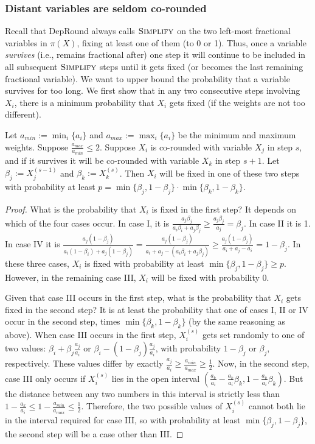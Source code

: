 \subsubsection{Distant variables are seldom co-rounded}
Recall that {\sc DepRound} always calls $\textsc{Simplify}$ on the two left-most fractional variables in $\pi(X)$, fixing at least one of them (to 0 or 1). Thus, once a variable \emph{survives} (i.e., remains fractional after) one step it will continue to be included in all subsequent $\textsc{Simplify}$ steps until it gets fixed (or becomes the last remaining fractional variable). We want to upper bound the probability that a variable survives for too long. We first show that in any two consecutive steps involving $X_i$, there is a minimum probability that $X_i$ gets fixed (if the weights are not too different).
\begin{lemma}\label{lemma:pair-prob}
Let $a_{min}:=\min_i\{a_i\}$ and $a_{max}:=\max_i\{a_i\}$ be the minimum and maximum weights. Suppose $\frac{a_{max}}{a_{min}}\le 2$. 
Suppose $X_i$ is co-rounded with variable $X_j$ in step $s$, and if it survives it will be co-rounded with variable $X_k$ in step $s+1$. Let $\beta_j:=X_j^{(s-1)}$ and $\beta_k:=X_k^{(s)}$. 
Then $X_i$ will be fixed in one of these two steps with probability at least $p=\min\{\beta_j,1-\beta_j\}\cdot\min\{\beta_k,1-\beta_k\}$.
\end{lemma}
\begin{proof}
What is the probability that $X_i$ is fixed in the first step? It depends on which of the four cases occur. In case I, it is $\frac{a_j\beta_j}{a_i\beta_i+a_j\beta_j}\ge \frac{a_j\beta_j}{a_j}=\beta_j$. In case II it is 1. In case IV it is $\frac{a_j(1-\beta_j)}{a_i(1-\beta_i)+a_j(1-\beta_j)}
= \frac{a_j(1-\beta_j)}{a_i+a_j - (a_i\beta_i+a_j\beta_j)}
\ge  \frac{a_j(1-\beta_j)}{a_i+a_j-a_i}=1-\beta_j$. In these three cases, $X_i$ is fixed with probability at least $\min\{\beta_j,1-\beta_j\}\ge p$. However, in the remaining case III, $X_i$ will be fixed with probability 0. 

Given that case III occurs in the first step, what is the probability that $X_i$ gets fixed in the second step? It is at least the probability that one of cases I, II or IV occur in the second step, times $\min\{\beta_k,1-\beta_k\}$ (by the same reasoning as above). When case III occurs in the first step, $X_i^{(s)}$ gets set randomly to one of two values: $\beta_i+\beta_j\frac{a_j}{a_i}$ or $\beta_i-(1-\beta_j)\frac{a_j}{a_i}$, with probability $1-\beta_j$ or $\beta_j$, respectively.  These values differ by exactly $\frac{a_j}{a_i} \ge\frac{a_{min}}{a_{max}}\ge\frac12$. 
Now, in the second step, case III only occurs if $X_i^{(s)}$ lies in the open interval $(\frac{a_k}{a_i}-\frac{a_k}{a_i}\beta_k, 1-\frac{a_k}{a_i}\beta_k)$. But the distance between any two numbers in this interval is strictly less than $1-\frac{a_k}{a_i}\le1-\frac{a_{min}} {a_{max}}\le\frac12$. Therefore, the two possible values of $X_i^{(s)}$ cannot both lie in the interval required for case III, so with probability at least $\min\{\beta_j,1-\beta_j\}$, the second step will be a case other than III. 
\end{proof} 

